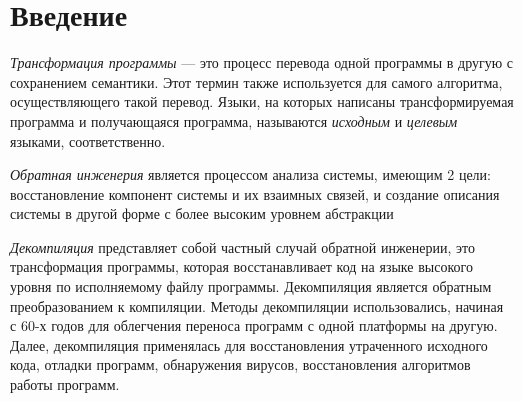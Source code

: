 \documentclass[a4paper,12pt,russian]{article}
\begin{document}

\tableofcontents

\newpage

\section*{Введение}
\emph{Трансформация программы} --- это процесс перевода одной программы в другую с сохранением семантики.
Этот термин также используется для самого алгоритма, осуществляющего такой перевод.
Языки, на которых написаны трансформируемая программа и получающаяся программа, называются \emph{исходным} и \emph{целевым} языками, соответственно.

\emph{Обратная инженерия} является процессом анализа системы, имеющим 2 цели: восстановление компонент системы и их взаимных связей, и создание описания системы в другой форме с более высоким уровнем абстракции

\emph{Декомпиляция} представляет собой частный случай обратной инженерии, это трансформация программы, которая восстанавливает код на языке высокого уровня по исполняемому файлу программы.
Декомпиляция является обратным преобразованием к компиляции.
Методы декомпиляции использовались, начиная с 60-х годов для облегчения переноса программ с одной платформы на другую.
Далее, декомпиляция применялась для восстановления утраченного исходного кода, отладки программ, обнаружения вирусов, восстановления алгоритмов работы программ.
\end{document}
